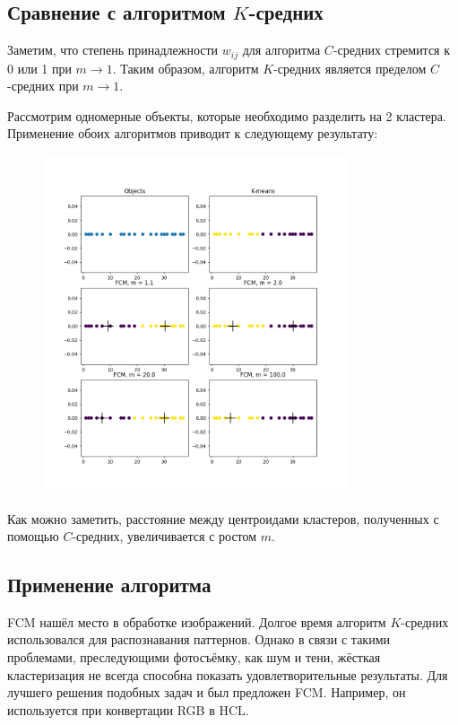 \subsection{Сравнение с алгоритмом $K$-средних}

Заметим, что степень принадлежности $w_{ij}$ для алгоритма $C$-средних стремится к 0 или 1 при
$m \to 1$. Таким образом, алгоритм $K$-средних является пределом $C$-средних при $m \to 1$.

Рассмотрим одномерные объекты, которые необходимо разделить на 2 кластера. Применение обоих
алгоритмов приводит к следующему результату:
\begin{figure}[H]
    \centering
    \includegraphics[width=0.8\textwidth]{chapters/clustering/images/fuzzy-clustering.png}
\end{figure}

Как можно заметить, расстояние между центроидами кластеров, полученных с помощью $C$-средних,
увеличивается с ростом $m$.

\subsection{Применение алгоритма}

FCM нашёл место в обработке изображений. Долгое время алгоритм $K$-средних использовался для
распознавания паттернов. Однако в связи с такими проблемами, преследующими фотосъёмку, как шум и
тени, жёсткая кластеризация не всегда способна показать удовлетворительные результаты. Для лучшего
решения подобных задач и был предложен FCM. Например, он используется при конвертации RGB в HCL.

